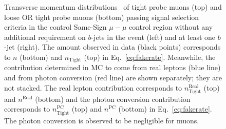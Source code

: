 \begin{figure}[h!]
{}
\vspace{-10mm}\caption{Transverse momentum distributions \pt\ of tight probe muons (top) and loose OR tight probe muons (bottom) passing signal selection criteria in the control Same-Sign $\mu-\mu$ control region without any additional requirement on $b$-jets in the event (left) and at least one $b$-jet (right). 
The amount observed in data (black points) corresponds to $n$ (bottom) and $n_{\textrm{Tight}}$ (top) in Eq.~\ref{eq:fakerate}. 
Meanwhile, the contribution determined in MC to come from real leptons (blue line) and from photon conversion (red line) are shown 
separately; they are not stacked. The real lepton contribution corresponds to 
$n_{\textrm{Tight}}^{\textrm{Real}}$ (top) and $n^{\textrm{Real}}$ (bottom) and the photon conversion 
contribution corresponds to $n_{\textrm{Tight}}^{\textrm{PC}}$ (top) and $n^{\textrm{PC}}$ (bottom) in Eq.~\ref{eq:fakerate}. The photon conversion is 
observed to be negligible for muons.  }
\label{fig:fakeEff_CRs_muon}
\end{figure}

